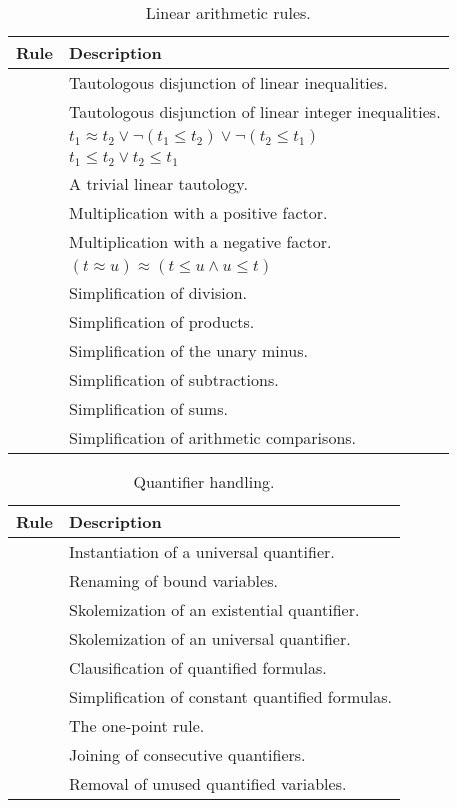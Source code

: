 \begin{xltabular}{\linewidth}{l X}
\caption{Linear arithmetic rules.}
\label{rule-tab:la-tauts}\\
  Rule & Description \\
  \hline
{} & Tautologous disjunction of linear inequalities. \\
 & Tautologous disjunction of linear integer inequalities. \\
 & $t_1 ≈ t_2 \lor \neg (t_1 \leq t_2) \lor \neg (t_2 \leq t_1)$ \\
 & $t_1 \leq t_2 \lor t_2 \leq t_1$ \\
 & A trivial linear tautology. \\
 & Multiplication with a positive factor. \\
 & Multiplication with a negative factor.\\
 & $(t ≈ u) ≈ (t \leq u \land u \leq t)$ \\
 & Simplification of division. \\
 & Simplification of products. \\
 & Simplification of the unary minus. \\
 & Simplification of subtractions. \\
 & Simplification of sums. \\
 & Simplification of arithmetic comparisons. \\
\end{xltabular}

\begin{xltabular}{\linewidth}{l X}
\caption{Quantifier handling.}
\label{rule-tab:quants}\\
  Rule & Description \\
  \hline
{} & Instantiation of a universal quantifier. \\
 & Renaming of bound variables. \\
 & Skolemization of an existential quantifier. \\
 & Skolemization of an universal quantifier. \\
 & Clausification of quantified formulas. \\
 & Simplification of constant quantified formulas. \\
 & The one-point rule. \\
 & Joining of consecutive quantifiers. \\
 & Removal of unused quantified variables. \\
\end{xltabular}

